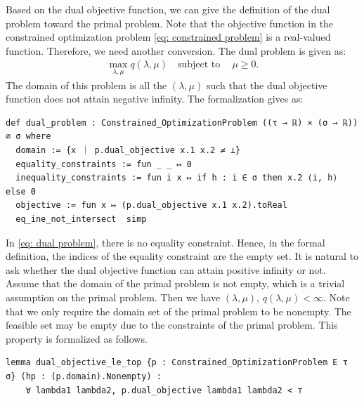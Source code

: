 \documentclass[sn-mathphys]{JORSC-jnl}%
\theoremstyle{thmstyleone}%
\theoremstyle{thmstylethree}%
\begin{document}
Based on the dual objective function, we can give the definition of the dual problem toward the primal problem. Note that the objective function in the constrained optimization problem \eqref{eq: constrained problem} is a real-valued function. Therefore, we need another conversion. The dual problem is given as:
\begin{align}\label{eq: dual problem}
    \max\limits_{\lambda, \mu} q(\lambda, \mu)  \quad  \text{subject to}\  \quad \mu \geq 0.
\end{align}
The domain of this problem is all the $(\lambda, \mu)$ such that the dual objective function does not attain negative infinity. The formalization gives as:
\begin{lstlisting}
def dual_problem : Constrained_OptimizationProblem ((τ → ℝ) × (σ → ℝ)) ∅ σ where
  domain := {x ｜ p.dual_objective x.1 x.2 ≠ ⊥}
  equality_constraints := fun _ _ ↦ 0
  inequality_constraints := fun i x ↦ if h : i ∈ σ then x.2 ⟨i, h⟩ else 0
  objective := fun x ↦ (p.dual_objective x.1 x.2).toReal
  eq_ine_not_intersect  simp
\end{lstlisting}
In \eqref{eq: dual problem}, there is no equality constraint. Hence, in the formal definition, the indices of the equality constraint are the empty set. It is natural to ask whether the dual objective function can attain positive infinity or not. Assume that the domain of the primal problem is not empty, which is a trivial assumption on the primal problem. Then we have $(\lambda, \mu)$, $q(\lambda, \mu) < \infty$. Note that we only require the domain set of the primal problem to be nonempty. The feasible set may be empty due to the constraints of the primal problem. This property is formalized as follows.
\begin{lstlisting}
lemma dual_objective_le_top {p : Constrained_OptimizationProblem E τ σ} (hp : (p.domain).Nonempty) :
    ∀ lambda1 lambda2, p.dual_objective lambda1 lambda2 < ⊤ 
\end{lstlisting}
\end{document}
